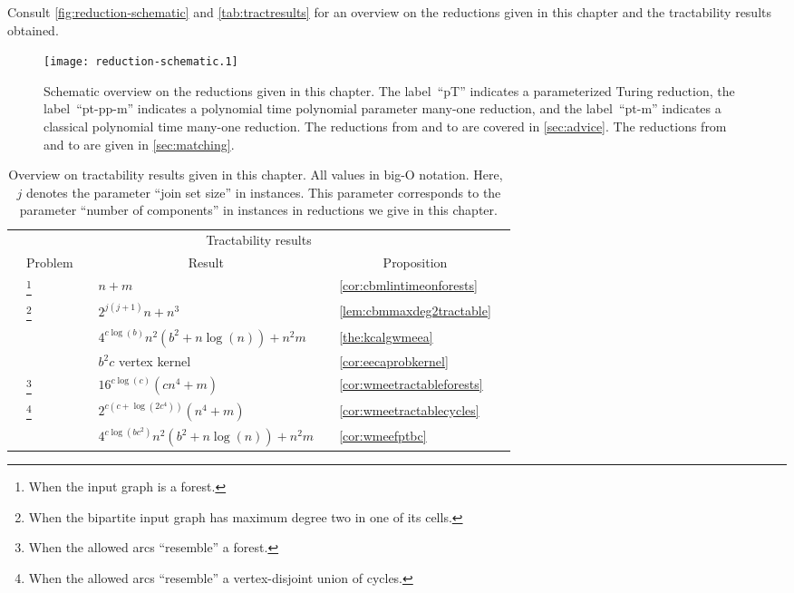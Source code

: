 Consult \autoref{fig:reduction-schematic} and \autoref{tab:tractresults} for an overview on the reductions given in this chapter and the tractability results obtained.
\begin{figure}\begin{center}
    \texttt{[image: reduction-schematic.1]}
    \caption{Schematic overview on the reductions given in this chapter. The label~``pT'' indicates a parameterized Turing reduction, the label~``pt-pp-m'' indicates a polynomial time polynomial parameter many-one reduction, and the label~``pt-m'' indicates a classical polynomial time many-one reduction. The reductions from and to \pWMEEs{} are covered in \autoref{sec:advice}. The reductions from and to \pCBMs{} are given in \autoref{sec:matching}.}
    \label{fig:reduction-schematic}
  \end{center}
\end{figure}\begin{table}
  \begin{minipage}{\linewidth}
  \centering
  \begin{tabularx}{\textwidth}{X l X l X l X} \toprule
    & \multicolumn{5}{c}{Tractability results} & \\
& \multicolumn{1}{c}{Problem} && \multicolumn{1}{c}{Result} && \multicolumn{1}{c}{Proposition} & \\
\midrule
    & \pCBMs{}\footnote{When the input graph is a forest.}  && $n+m$ && \autoref{cor:cbmlintimeonforests} \\
    & \pCBMs{}\footnote{When the bipartite input graph has maximum degree two in one of its cells.} && $2^{j(j+1)}n + n^3$ && \autoref{lem:cbmmaxdeg2tractable}  \\
    & \pWMEECAs{} && $4^{c\log(b)}n^2(b^2+ n\log(n)) + n^2m$ && \autoref{the:kcalgwmeea} \\
    & \pWMEEAs{} && $b^2c$ vertex kernel && \autoref{cor:eecaprobkernel} \\
    & \pWMEEs{}\footnote{When the allowed arcs ``resemble'' a forest.} && $16^{c\log(c)}(cn^4 + m)$ && \autoref{cor:wmeetractableforests}  \\
    & \pWMEEs{}\footnote{When the allowed arcs ``resemble'' a vertex-disjoint union of cycles.} && $2^{c(c + \log(2c^4))}(n^4 + m)$ && \autoref{cor:wmeetractablecycles}  \\
    & \pWMEEs{} && $4^{c\log(bc^2)}n^2(b^2 + n\log(n)) + n^2m$ && \autoref{cor:wmeefptbc}  \\
    \bottomrule
  \end{tabularx}
  \caption{Overview on tractability results given in this chapter. All values in big-O notation. Here,~$j$ denotes the parameter ``join set size'' in \pCBMs{} instances. This parameter corresponds to the parameter ``number of components'' in \pWMEEs{} instances in reductions we give in this chapter.}
  \label{tab:tractresults}
\end{minipage}
\end{table}


